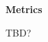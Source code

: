 \documentclass{article}
\begin{document}
\begin{multicols*}{2}



\textbf{Metrics}

TBD?




\end{multicols*}
\end{document}
